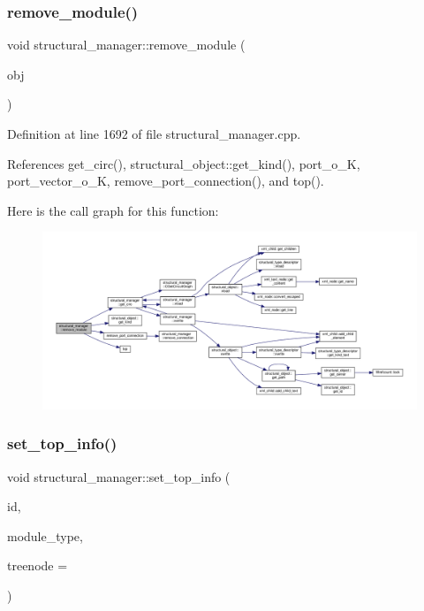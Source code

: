 \subsubsection{\texorpdfstring{remove\+\_\+module()}{remove\_module()}}
{\footnotesize\ttfamily void structural\+\_\+manager\+::remove\+\_\+module (\begin{DoxyParamCaption}\item[{\hyperlink{structural__objects_8hpp_a8ea5f8cc50ab8f4c31e2751074ff60b2}{structural\+\_\+object\+Ref}}]{obj }\end{DoxyParamCaption})}



Definition at line 1692 of file structural\+\_\+manager.\+cpp.



References get\+\_\+circ(), structural\+\_\+object\+::get\+\_\+kind(), port\+\_\+o\+\_\+K, port\+\_\+vector\+\_\+o\+\_\+K, remove\+\_\+port\+\_\+connection(), and top().

Here is the call graph for this function\+:
\nopagebreak
\begin{figure}[H]
\begin{center}
\leavevmode
\includegraphics[width=350pt]{d7/d6b/classstructural__manager_a1160aa7f436e8238fe97864c86c834ad_cgraph}
\end{center}
\end{figure}
\mbox{\label{classstructural__manager_a848a594d01b214d2b17deefdc127ca71}} 
\subsubsection{\texorpdfstring{set\+\_\+top\+\_\+info()}{set\_top\_info()}}
{\footnotesize\ttfamily void structural\+\_\+manager\+::set\+\_\+top\+\_\+info (\begin{DoxyParamCaption}\item[{std\+::string}]{id,  }\item[{\hyperlink{structural__objects_8hpp_a219296792577e3292783725961506c83}{structural\+\_\+type\+\_\+descriptor\+Ref}}]{module\+\_\+type,  }\item[{unsigned int}]{treenode = {} }\end{DoxyParamCaption})}



